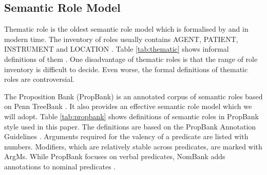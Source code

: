 \documentclass[a4paper]{article}
\begin{document}
\subsection{Semantic Role Model} \label{sec:semanticrole}
Thematic role is the oldest semantic role model which is formalised by \citet{gruber1965studies} and \citet{fillmore1968case} in modern time. The inventory of roles usually contains AGENT, PATIENT, INSTRUMENT and LOCATION \citep{aarts2013english}. Table \ref{tab:thematic} shows informal definitions of them \citep{jurafsky2014speech}. One disadvantage of thematic roles is that the range of role inventory is difficult to decide. Even worse, the formal definitions of thematic roles are controversial. 

The Proposition Bank (PropBank) is an annotated corpus of semantic roles based on Penn TreeBank \citep{palmer2005proposition}. It also provides an effective semantic role model which we will adopt. Table \ref{tab:propbank} shows definitions of semantic roles in PropBank style used in this paper. The definitions are based on the PropBank Annotation Guidelines \citep{bonial2010propbank}. Arguments required for the valency of a predicate are listed with numbers. Modifiers, which are relatively stable across predicates, are marked with ArgMs. While PropBank focuses on verbal predicates, NomBank adds annotations to nominal predicates \citep{meyers2004nombank}. 
\end{document}
